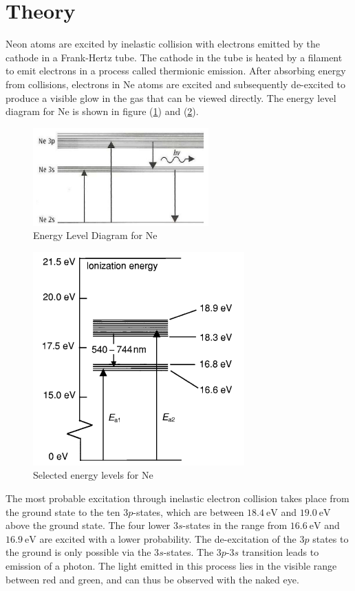 \documentclass[%
 reprint,
 amsmath,amssymb,
 aps,
]{revtex4-2}
\begin{document}
\section{Theory}
    Neon atoms are excited by inelastic collision with electrons emitted by the cathode in a Frank-Hertz tube. The cathode in the tube is heated by a filament to emit electrons in a process called thermionic emission. After absorbing energy from collisions, electrons in Ne atoms are excited and subsequently de-excited to produce a visible glow in the gas that can be viewed directly. The energy level diagram for Ne is shown in figure (\ref{fig:energyLevelNe}) and (\ref{fig:energyLevelNe2}).
    \begin{figure}[b]
        \centering
        \includegraphics{Figures/neonstates.png}
        \caption{Energy Level Diagram for Ne}
        \label{fig:energyLevelNe}
    \end{figure}
    \begin{figure}
        \centering
        \includegraphics{Figures/neonstates2.png}
        \caption{Selected energy levels for Ne\cite{Moore}}
        \label{fig:energyLevelNe2}
    \end{figure}
    The most probable excitation through inelastic electron collision takes place from the ground state to the ten 3$p$-states, which are between $\SI{18.4}{\electronvolt}$ and $\SI{19.0}{\electronvolt}$ above the ground state. The four lower 3$s$-states in the range from $\SI{16.6}{\electronvolt}$ and $\SI{16.9}{\electronvolt}$ are excited with a lower probability. The de-excitation of the 3$p$ states to the ground is only possible via the 3$s$-states. The 3$p$-3$s$ transition leads to emission of a photon. The light emitted in this process lies in the visible range between red and green, and can thus be observed with the naked eye.
\end{document}
